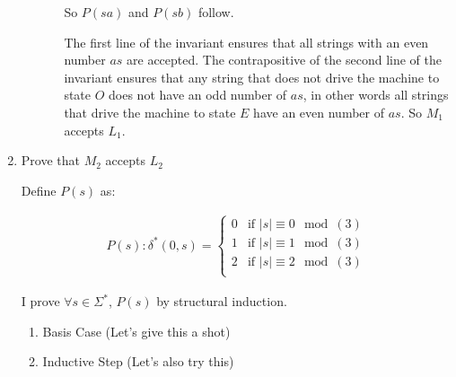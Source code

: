 \documentclass[12pt]{article}
\begin{document}
\begin{enumerate}[1.]
\begin{mdframed}
\begin{enumerate}[1.]
\begin{enumerate}[1.]
\begin{mdframed}
            \end{mdframed}

            \bigskip

            So $P(sa)$ and $P(sb)$ follow.

            \bigskip

            The first line of the invariant ensures that all strings with an even number
            $as$ are accepted. The contrapositive of the second line of the invariant
            ensures that any string that does not drive the machine to state $O$ does
            not have an odd number of $as$, in other words all strings that drive
            the machine to state $E$ have an even number of $as$. So $M_1$ accepts $L_1$.

        \end{enumerate}
    \end{enumerate}
    \end{mdframed}

    \item Prove that $M_2$ accepts $L_2$

    \bigskip

    Define $P(s)$ as:

    \begin{align}
        P(s): \delta^*(0,s) = \begin{cases}
            0 & \text{if $\vert s \vert \equiv 0 \mod (3)$}\\
            1 & \text{if $\vert s \vert \equiv 1 \mod (3)$}\\
            2 & \text{if $\vert s \vert \equiv 2 \mod (3)$}\\
        \end{cases}
    \end{align}

    I prove $\forall s \in \Sigma^*$, $P(s)$ by structural induction.

    \bigskip

    \begin{enumerate}[1.]
        \item Basis Case (Let's give this a shot)

        \begin{mdframed}

        \end{mdframed}

        \item Inductive Step (Let's also try this)

        \begin{mdframed}


\end{mdframed}
\end{enumerate}
\end{enumerate}
\end{document}
